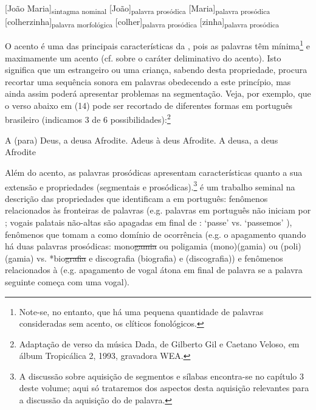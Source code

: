 \documentclass[output=paper]{LSP/langsci}
\begin{document}
\ea\label{ex:santana_12}
[João Maria]\textsubscript{sintagma nominal} [João]\textsubscript{palavra prosódica} [Maria]\textsubscript{palavra prosódica}
\z
\ea\label{ex:santana_13}
[colherzinha]\textsubscript{palavra morfológica} [colher]\textsubscript{palavra prosódica} [zinha]\textsubscript{palavra prosódica}
\z

O acento é uma das principais características da , pois as palavras têm mínima\footnote{Note-se, no entanto, que há uma pequena quantidade de palavras consideradas sem acento, os clíticos fonológicos.} e maximamente um acento (cf. \citealt{jakobson1941} sobre o caráter deliminativo do acento). Isto significa que um estrangeiro ou uma criança, sabendo desta propriedade, procura recortar uma sequência sonora em palavras obedecendo a este princípio, mas ainda assim poderá apresentar problemas na segmentação. Veja, por exemplo, que o verso abaixo em (14) pode ser recortado de diferentes formas em português brasileiro (indicamos 3 de 6 possibilidades):\footnote{Adaptação de verso da música Dada, de Gilberto Gil e Caetano Veloso, em álbum Tropicálica 2, 1993, gravadora WEA.}

\ea\label{ex:santana_14}
\ea\label{ex:santana_14a}
A (para) Deus, a deusa Afrodite.
\ex\label{ex:santana_14b}
Adeus à deus Afrodite.
\ex\label{ex:santana_14c}
A deusa, a deus Afrodite
\zl

Além do acento, as palavras prosódicas apresentam características quanto a sua extensão e propriedades (segmentais e prosódicas).\footnote{A discussão sobre aquisição de segmentos e sílabas encontra-se no capítulo 3 deste volume; aqui só trataremos dos aspectos desta aquisição relevantes para a discussão da aquisição do  de palavra.} \citet{vigario2003} é um trabalho seminal na descrição das propriedades que identificam a  em português: fenômenos relacionados às fronteiras de palavras (e.g. palavras em português não iniciam por \ipa{[\textltailn,R,L]}; vogais palatais não-altas são apagadas em final de : `passe'  vs. `passemos' ), fenômenos que tomam a  como domínio de ocorrência (e.g. o apagamento quando há duas palavras prosódicas: mono\sout{gamia} ou poligamia (mono)(gamia) ou (poli)(gamia) vs. *bio\sout{grafia} e discografia (biografia) e (discografia)) e fenômenos relacionados à  (e.g. apagamento de vogal átona em final de palavra se a palavra seguinte começa com uma vogal). 
\end{document}
